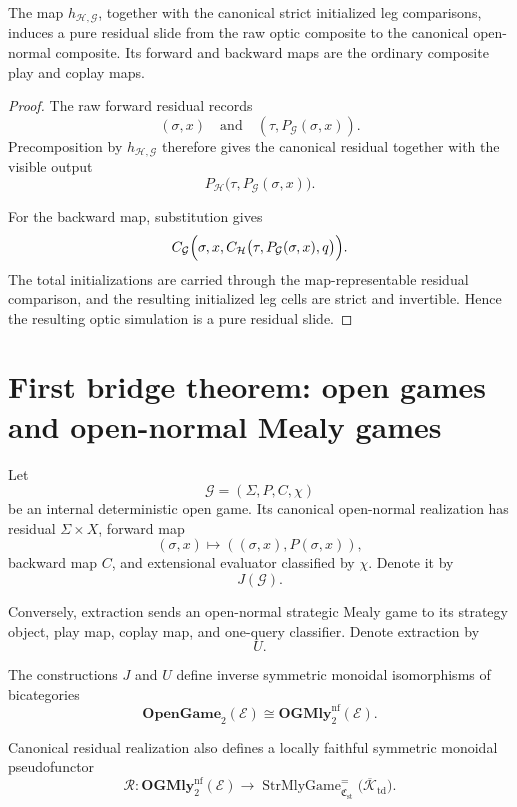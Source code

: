 \begin{lemma}
\label{lem:composite-residual-canonicalization}
The map \(h_{\mathcal H,\mathcal G}\), together with the canonical strict initialized leg
comparisons, induces a pure residual slide from the raw optic composite to the canonical open-normal
composite. Its forward and backward maps are the ordinary composite play and coplay maps.
\end{lemma}

\begin{proof}
The raw forward residual records
\[
  (\sigma,x)
  \quad\text{and}\quad
  (\tau,P_{\mathcal G}(\sigma,x)).
\]
Precomposition by \(h_{\mathcal H,\mathcal G}\) therefore gives the canonical residual together with
the visible output
\[
  P_{\mathcal H}
  \bigl(
    \tau,
    P_{\mathcal G}(\sigma,x)
  \bigr).
\]

For the backward map, substitution gives
\[
  C_{\mathcal G}
  \Bigl(
    \sigma,
    x,
    C_{\mathcal H}
    \bigl(
      \tau,
      P_{\mathcal G}(\sigma,x),
      q
    \bigr)
  \Bigr).
\]
The total initializations are carried through the map-representable residual comparison, and the
resulting initialized leg cells are strict and invertible. Hence the resulting optic simulation is a
pure residual slide.
\end{proof}

\section{First bridge theorem: open games and open-normal Mealy games}
\label{sec:first-bridge-theorem}

Let
\[
  \mathcal G=(\Sigma,P,C,\chi)
\]
be an internal deterministic open game. Its canonical open-normal realization has residual
\(\Sigma\times X\), forward map
\[
  (\sigma,x)
  \longmapsto
  ((\sigma,x),P(\sigma,x)),
\]
backward map \(C\), and extensional evaluator classified by \(\chi\). Denote it by
\[
  J(\mathcal G).
\]

Conversely, extraction sends an open-normal strategic Mealy game to its strategy object, play map,
coplay map, and one-query classifier. Denote extraction by
\[
  U.
\]

\begin{theorem}
\label{thm:first-bridge}
The constructions \(J\) and \(U\) define inverse symmetric monoidal isomorphisms of bicategories
\[
  \boxed{
  \mathbf{OpenGame}_2(\mathcal E)
  \cong
  \mathbf{OGMly}^{\mathrm{nf}}_2(\mathcal E).
  }
\]

Canonical residual realization also defines a locally faithful symmetric monoidal pseudofunctor
\[
  \mathcal R:
  \mathbf{OGMly}^{\mathrm{nf}}_2(\mathcal E)
  \longrightarrow
  \operatorname{StrMlyGame}^{=}_{\mathfrak C_{\mathrm{st}}}
  \bigl(
    \overline{\mathcal K}_{\mathrm{td}}
  \bigr).
\]
\end{theorem}

